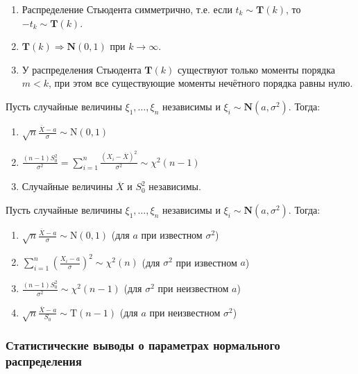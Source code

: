 \begin{namedthm}\leavevmode
\begin{enumerate}
    \item Распределение Стьюдента симметрично, т.е. если $t_k \sim \mathbf{T}(k)$, то $-t_k \sim \mathbf{T}(k)$.
    \item $\mathbf{T}(k) \Rightarrow \mathbf{N}(0,1)$ при $k \to \infty$.
    \item У распределения Стьюдента $\mathbf{T}(k)$ существуют только моменты порядка $m < k$, при этом все существующие моменты нечётного порядка равны нулю.
\end{enumerate}
\end{namedthm}

\begin{namedthm}
Пусть случайные величины $\xi_1, \ldots, \xi_n$ независимы и ${\xi_i \sim \mathbf{N}(a,\sigma^{2})}$. Тогда:
\begin{enumerate}
    \item $\sqrt{n} \frac{\overline{X}-a}{\sigma} \sim \mathrm{N}(0,1)$
    \item $\frac{(n-1) S_{0}^{2}}{\sigma^{2}}=\sum\limits_{i=1}^{n} \frac{\left(X_{i}-\overline{X}\right)^{2}}{\sigma^{2}} \sim \chi^{2}(n-1)$
    \item Случайные величины $\overline{X}$ и $S_{0}^{2}$ независимы.
\end{enumerate}
\end{namedthm}
\begin{crlr}
    Пусть случайные величины $\xi_1, \ldots, \xi_n$ независимы и ${\xi_i \sim \mathbf{N}(a,\sigma^{2})}$. Тогда:
    \begin{enumerate}
        \item $\sqrt{n} \frac{\overline{X}-a}{\sigma} \sim \mathrm{N}(0,1)$ (для $a$ при известном $\sigma^{2}$)
        \item $\sum\limits_{i=1}^{n}\left(\frac{X_{i}-a}{\sigma}\right)^{2} \sim \chi^{2}(n)$ (для $\sigma^{2}$ при известном $a$)
        \item $\frac{(n-1) S_{0}^{2}}{\sigma^{2}} \sim \chi^{2}(n-1)$ (для $\sigma^{2}$ при неизвестном $a$)
        \item $\sqrt{n} \frac{\overline{X}-a}{S_{0}} \sim \mathrm{T}(n-1)$ (для $a$ при неизвестном $\sigma^{2}$)
    \end{enumerate}
\end{crlr}

\subsubsection{Статистические выводы о параметрах нормального распределения}

